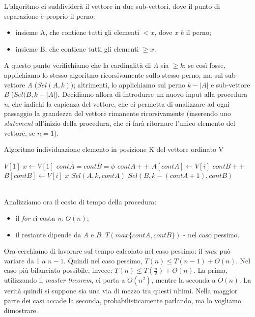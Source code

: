\newpage
L'algoritmo ci suddividerà il vettore in due sub-vettori, dove il punto di separazione è proprio il perno:
\begin{itemize}
	\item insieme A, che contiene tutti gli elementi $< x$, dove $x$ è il perno;
	\item insieme B, che contiene tutti gli elementi $\geq x$.
\end{itemize}
A questo punto verifichiamo che la cardinalità di \textit{A} sia $\geq k$: se così fosse, applichiamo lo stesso algoritmo ricorsivamente sullo stesso perno, ma sul sub-vettore \textit{A} ($Sel(A,k)$); altrimenti, lo applichiamo sul perno $k-|A|$ e sub-vettore \textit{B} ($Sel(B, k-|A|$). Decidiamo allora di introdurre un nuovo input alla procedura \textit{n}, che indichi la capienza del vettore, che ci permetta di analizzare ad ogni passaggio la grandezza del vettore rimanente ricorsivamente (inserendo uno \textit{statement} all'inizio della procedura, che ci farà ritornare l'unico elemento del vettore, se $n=1$). \\
\begin{algorithm}
	\caption{Algoritmo individuazione elemento in posizione K del vettore ordinato V}\label{alg:KinV}
	\begin{algorithmic}[1]
				\State \Return $V[1]$
			\EndIf
			\State $x \gets V[1]$
			\State $contA = contB = \phi$
					\State $contA++$
					\State $A[contA] \gets V[i]$
				\Else
					\State $contB++$
					\State $B[contB] \gets V[i]$
				\EndIf
			\EndFor
				\State \Return $x$
			\EndIf
				\State \Return $Sel(A, k, contA)$
			\Else
				\State \Return $Sel(B, k-(contA+1), contB)$
			\EndIf
		\EndFunction
	\end{algorithmic}
\end{algorithm} \hfill \\
Analizziamo ora il costo di tempo della procedura:
\begin{itemize}
	\item il \textit{for} ci costa \textit{n}: $O(n)$;
	\item il restante dipende da \textit{A} e \textit{B}: $T(max\{contA,contB\})$ - nel caso pessimo.
\end{itemize}
Ora cerchiamo di lavorare sul tempo calcolato nel caso pessimo: il \textit{max} può variare da 1 a $n-1$. Quindi nel caso pessimo, $T(n) \leq T(n-1) + O(n)$. Nel caso più bilanciato possibile, invece: $T(n) \leq T(\frac{n}{2}) + O(n)$. La prima, utilizzando il \textit{master theorem}, ci porta a $O(n^2)$, mentre la seconda a $O(n)$. La verità quindi si suppone sia una via di mezzo tra questi ultimi. Nella maggior parte dei casi accade la seconda, probabilisticamente parlando, ma lo vogliamo dimostrare. \\
